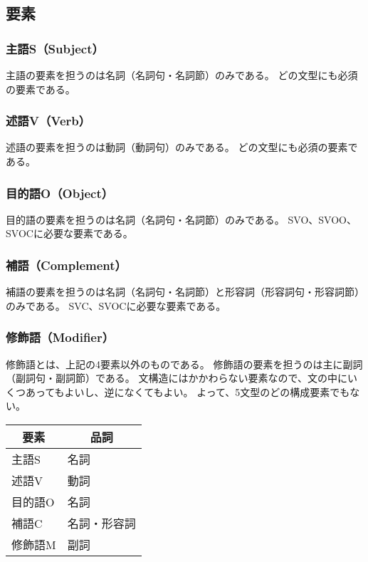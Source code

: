 \subsection{要素}

\subsubsection{主語S（Subject）}
主語の要素を担うのは名詞（名詞句・名詞節）のみである。
どの文型にも必須の要素である。

\subsubsection{述語V（Verb）}
述語の要素を担うのは動詞（動詞句）のみである。
どの文型にも必須の要素である。

\subsubsection{目的語O（Object）}
目的語の要素を担うのは名詞（名詞句・名詞節）のみである。
SVO、SVOO、SVOCに必要な要素である。

\subsubsection{補語（Complement）}
補語の要素を担うのは名詞（名詞句・名詞節）と形容詞（形容詞句・形容詞節）のみである。
SVC、SVOCに必要な要素である。

\subsubsection{修飾語（Modifier）}
修飾語とは、上記の4要素以外のものである。
修飾語の要素を担うのは主に副詞（副詞句・副詞節）である。
文構造にはかかわらない要素なので、文の中にいくつあってもよいし、逆になくてもよい。
よって、5文型のどの構成要素でもない。

\begin{table}[h]
  \centering
  \begin{tabular}{ll}
    \hline
    \multicolumn{1}{c}{要素} & \multicolumn{1}{c}{品詞}\\
    \hline \hline
    主語S & 名詞\\
    述語V & 動詞\\
    目的語O & 名詞\\
    補語C & 名詞・形容詞\\
    修飾語M & 副詞\\
    \hline
  \end{tabular}
\end{table}

